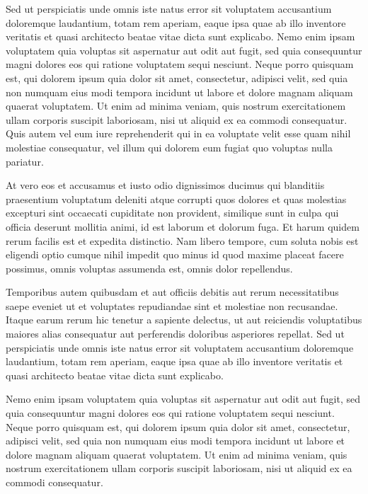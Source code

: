 \documentclass[12pt,letterpaper]{article}
\begin{document}
Sed ut perspiciatis unde omnis iste natus error sit voluptatem accusantium doloremque laudantium, totam rem aperiam, eaque ipsa quae ab illo inventore veritatis et quasi architecto beatae vitae dicta sunt explicabo. Nemo enim ipsam voluptatem quia voluptas sit aspernatur aut odit aut fugit, sed quia consequuntur magni dolores eos qui ratione voluptatem sequi nesciunt. Neque porro quisquam est, qui dolorem ipsum quia dolor sit amet, consectetur, adipisci velit, sed quia non numquam eius modi tempora incidunt ut labore et dolore magnam aliquam quaerat voluptatem. Ut enim ad minima veniam, quis nostrum exercitationem ullam corporis suscipit laboriosam, nisi ut aliquid ex ea commodi consequatur. Quis autem vel eum iure reprehenderit qui in ea voluptate velit esse quam nihil molestiae consequatur, vel illum qui dolorem eum fugiat quo voluptas nulla pariatur\cite{dolor2024}.

At vero eos et accusamus et iusto odio dignissimos ducimus qui blanditiis praesentium voluptatum deleniti atque corrupti quos dolores et quas molestias excepturi sint occaecati cupiditate non provident, similique sunt in culpa qui officia deserunt mollitia animi, id est laborum et dolorum fuga. Et harum quidem rerum facilis est et expedita distinctio. Nam libero tempore, cum soluta nobis est eligendi optio cumque nihil impedit quo minus id quod maxime placeat facere possimus, omnis voluptas assumenda est, omnis dolor repellendus.

Temporibus autem quibusdam et aut officiis debitis aut rerum necessitatibus saepe eveniet ut et voluptates repudiandae sint et molestiae non recusandae. Itaque earum rerum hic tenetur a sapiente delectus, ut aut reiciendis voluptatibus maiores alias consequatur aut perferendis doloribus asperiores repellat. Sed ut perspiciatis unde omnis iste natus error sit voluptatem accusantium doloremque laudantium, totam rem aperiam, eaque ipsa quae ab illo inventore veritatis et quasi architecto beatae vitae dicta sunt explicabo.

Nemo enim ipsam voluptatem quia voluptas sit aspernatur aut odit aut fugit, sed quia consequuntur magni dolores eos qui ratione voluptatem sequi nesciunt. Neque porro quisquam est, qui dolorem ipsum quia dolor sit amet, consectetur, adipisci velit, sed quia non numquam eius modi tempora incidunt ut labore et dolore magnam aliquam quaerat voluptatem. Ut enim ad minima veniam, quis nostrum exercitationem ullam corporis suscipit laboriosam, nisi ut aliquid ex ea commodi consequatur.
\end{document}
